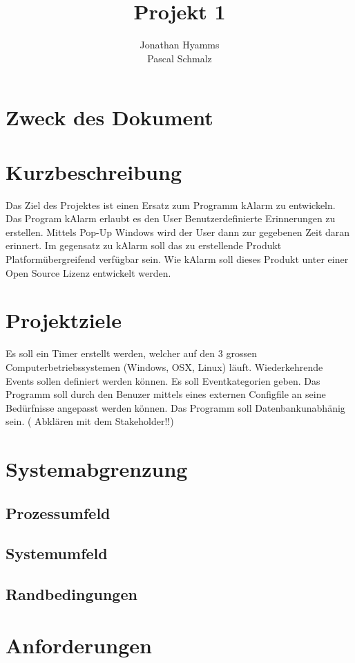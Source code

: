 \documentclass[a4paper,10pt]{report}
\title{Projekt 1}
\author{Jonathan Hyamms \\Pascal Schmalz}
\begin{document}
\maketitle
\tableofcontents

\begin{abstract}
\end{abstract}
\section{Zweck des Dokument}
\section{Kurzbeschreibung}
Das Ziel des Projektes ist einen Ersatz zum Programm kAlarm zu entwickeln.
Das Program kAlarm erlaubt es den User Benutzerdefinierte Erinnerungen zu erstellen. Mittels Pop-Up Windows wird der User dann zur gegebenen Zeit daran erinnert.
Im gegensatz zu kAlarm soll das zu erstellende Produkt Platformübergreifend verfügbar sein. Wie kAlarm soll dieses Produkt unter einer Open Source Lizenz entwickelt werden.
\section{Projektziele}
Es soll ein Timer erstellt werden, welcher auf den 3 grossen Computerbetriebssystemen (Windows, OSX, Linux)  läuft. 
Wiederkehrende Events sollen definiert werden können.
Es soll Eventkategorien geben.
Das Programm soll durch den Benuzer mittels  eines externen Configfile an seine Bedürfnisse angepasst werden können.
Das Programm soll Datenbankunabhänig sein. ( Abklären mit dem Stakeholder!!)
\section {Systemabgrenzung}
\subsection{Prozessumfeld}
\subsection{Systemumfeld}
\subsection{Randbedingungen}
\section{Anforderungen}
\end{document}
